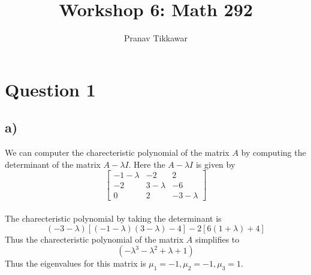 \documentclass{article}
\author{Pranav Tikkawar}
\title{Workshop 6: Math 292}
\begin{document}
\maketitle

\section*{Question 1}
\subsection*{a)}
We can computer the charecteristic polynomial of the matrix $A$ by computing the determinant of the matrix $A - \lambda I$. Here the $A - \lambda I$ is given by $$ \begin{bmatrix}
    -1 - \lambda & -2 & 2 \\
    -2 & 3 - \lambda & -6 \\
    0 & 2 & -3 - \lambda
\end{bmatrix}$$  
\\ 
The charecteristic polynomial by taking the determinant is 
$$(-3 - \lambda)[(-1-\lambda)(3-\lambda) - 4] - 2[6(1+\lambda) + 4] $$
Thus the charecteristic polynomial of the matrix $A$ simplifies to 
$$(-\lambda^3 - \lambda^2 + \lambda + 1)$$
Thus the eigenvalues for this matrix is $\mu_1 = -1, \mu_2 = -1, \mu_3 = 1$.
\end{document}
